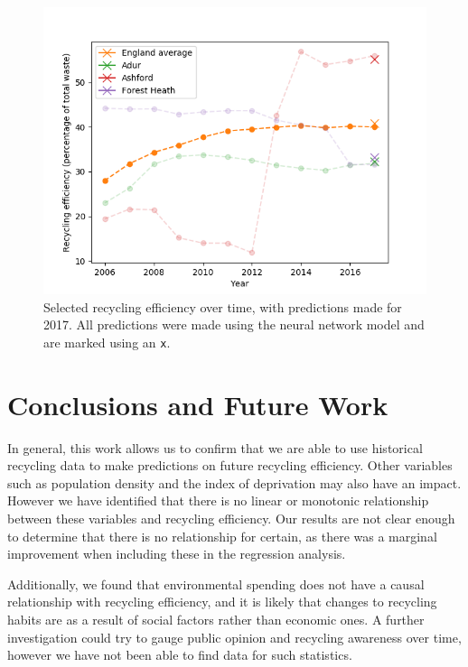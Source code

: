 \documentclass[11pt,conference]{IEEEtran}
\begin{document}
\begin{figure}[htbp]
    \begin{center}
        \includegraphics[width=\linewidth]{../figures/england_selected_efficiency_predictions.png}
    \caption{Selected recycling efficiency over time, with predictions made for 2017. All predictions were made using the neural network model and are marked using an \texttt{x}.}
    \label{fig:selected_predictions}
    \end{center}
\end{figure}

\section{Conclusions and Future Work}
In general, this work allows us to confirm that we are able to use historical recycling data to make predictions on future recycling efficiency. Other variables such as population density and the index of deprivation may also have an impact. However we have identified that there is no linear or monotonic relationship between these variables and recycling efficiency. Our results are not clear enough to determine that there is no relationship for certain, as there was a marginal improvement when including these in the regression analysis.

Additionally, we found that environmental spending does not have a causal relationship with recycling efficiency, and it is likely that changes to recycling habits are as a result of social factors rather than economic ones. A further investigation could try to gauge public opinion and recycling awareness over time, however we have not been able to find data for such statistics. 
\end{document}
